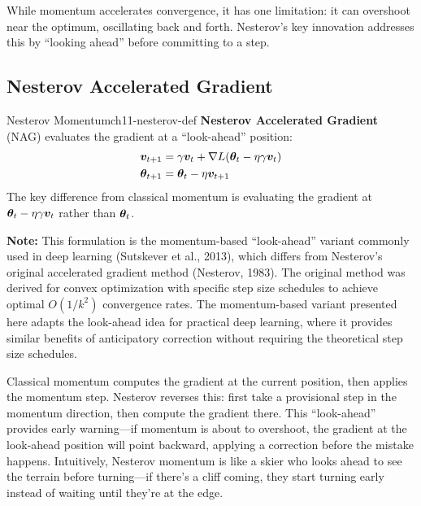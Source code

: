 \documentclass[../../main.tex]{subfiles}
\begin{document}
While momentum accelerates convergence, it has one limitation: it can overshoot near the optimum, oscillating back and forth. Nesterov's key innovation addresses this by ``looking ahead'' before committing to a step.

\subsection{Nesterov Accelerated Gradient}

\begin{definition}{Nesterov Momentum}{ch11-nesterov-def}
\textbf{Nesterov Accelerated Gradient} (NAG) evaluates the gradient at a ``look-ahead'' position:
\begin{align}
    \boldsymbol{v}_{t+1} &= \gamma \boldsymbol{v}_t + \nabla L(\boldsymbol{\theta}_t - \eta \gamma \boldsymbol{v}_t) \\
    \boldsymbol{\theta}_{t+1} &= \boldsymbol{\theta}_t - \eta \boldsymbol{v}_{t+1}
\end{align}
The key difference from classical momentum is evaluating the gradient at $\boldsymbol{\theta}_t - \eta \gamma \boldsymbol{v}_t$ rather than $\boldsymbol{\theta}_t$.

\textbf{Note:} This formulation is the momentum-based ``look-ahead'' variant commonly used in deep learning (Sutskever et al., 2013), which differs from Nesterov's original accelerated gradient method (Nesterov, 1983). The original method was derived for convex optimization with specific step size schedules to achieve optimal $O(1/k^2)$ convergence rates. The momentum-based variant presented here adapts the look-ahead idea for practical deep learning, where it provides similar benefits of anticipatory correction without requiring the theoretical step size schedules.
\end{definition}

\begin{intuition}
Classical momentum computes the gradient at the current position, then applies the momentum step. Nesterov reverses this: first take a provisional step in the momentum direction, then compute the gradient there. This ``look-ahead'' provides early warning---if momentum is about to overshoot, the gradient at the look-ahead position will point backward, applying a correction before the mistake happens. Intuitively, Nesterov momentum is like a skier who looks ahead to see the terrain before turning---if there's a cliff coming, they start turning early instead of waiting until they're at the edge.
\end{intuition}
\end{document}
